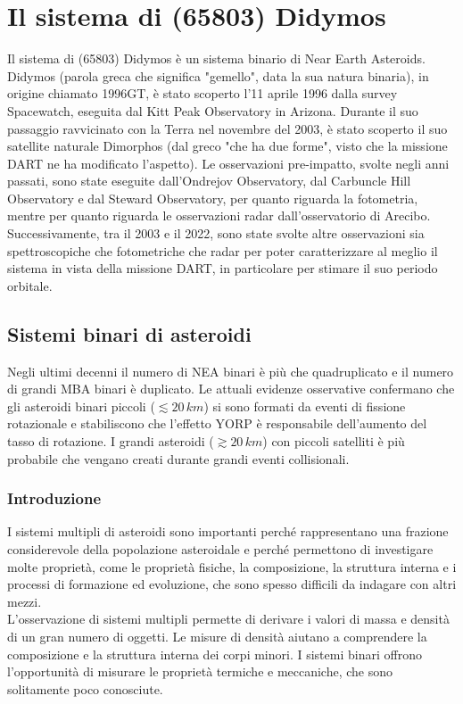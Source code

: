 \documentclass[a4paper,11pt,openright]{book}
\begin{document}
\chapter{Il sistema di (65803) Didymos}\label{ch:ch_4}
Il sistema di (65803) Didymos è un sistema binario di Near Earth Asteroids.\\
Didymos (parola greca che significa "gemello", data la sua natura binaria), in origine chiamato 1996GT, è stato scoperto l'11 aprile 1996 dalla survey Spacewatch, eseguita dal Kitt Peak Observatory in Arizona. Durante il suo passaggio ravvicinato con la Terra nel novembre del 2003, è stato scoperto il suo satellite naturale Dimorphos (dal greco "che ha due forme", visto che la missione DART ne ha modificato l'aspetto). Le osservazioni pre-impatto, svolte negli anni passati, sono state eseguite dall'Ondrejov Observatory, dal Carbuncle Hill Observatory e dal Steward Observatory, per quanto riguarda la fotometria, mentre per quanto riguarda le osservazioni radar dall'osservatorio di Arecibo.\\
Successivamente, tra il 2003 e il 2022, sono state svolte altre osservazioni sia spettroscopiche che fotometriche che radar per poter caratterizzare al meglio il sistema in vista della missione DART, in particolare per stimare il suo periodo orbitale.

\section{Sistemi binari di asteroidi}\label{sec:binary_system}
Negli ultimi decenni il numero di NEA binari è più che quadruplicato e il numero di grandi MBA binari è duplicato. Le attuali evidenze osservative confermano che gli asteroidi binari piccoli ($\lesssim 20\,km$) si sono formati da eventi di fissione rotazionale e stabiliscono che l'effetto YORP è responsabile dell'aumento del tasso di rotazione. I grandi asteroidi ($\gtrsim20\,km$) con piccoli satelliti è più probabile che vengano creati durante grandi eventi collisionali.

\subsection{Introduzione}
I sistemi multipli di asteroidi sono importanti perché rappresentano una frazione considerevole della popolazione asteroidale e perché permettono di investigare molte proprietà, come le proprietà fisiche, la composizione, la struttura interna e i processi di formazione ed evoluzione, che sono spesso difficili da indagare con altri mezzi.\\
L'osservazione di sistemi multipli permette di derivare i valori di massa e densità di un gran numero di oggetti. Le misure di densità aiutano a comprendere la composizione e la struttura interna dei corpi minori. I sistemi binari offrono l'opportunità di misurare le proprietà termiche e meccaniche, che sono solitamente poco conosciute.
\end{document}
